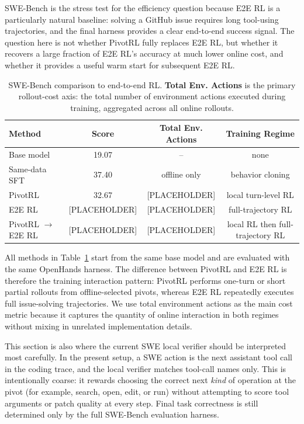 SWE-Bench is the stress test for the efficiency question because E2E RL is a particularly natural baseline: solving a GitHub issue requires long tool-using trajectories, and the final harness provides a clear end-to-end success signal. The question here is not whether PivotRL fully replaces E2E RL, but whether it recovers a large fraction of E2E RL's accuracy at much lower online cost, and whether it provides a useful warm start for subsequent E2E RL.

\begin{table}[t]
\centering
\small
\begin{tabular}{lccc}
\toprule
\textbf{Method} & \textbf{Score} & \textbf{Total Env. Actions} & \textbf{Training Regime} \\
\midrule
Base model & 19.07 & -- & none \\
Same-data SFT & 37.40 & offline only & behavior cloning \\
PivotRL & 32.67 & [PLACEHOLDER] & local turn-level RL \\
E2E RL & [PLACEHOLDER] & [PLACEHOLDER] & full-trajectory RL \\
PivotRL $\rightarrow$ E2E RL & [PLACEHOLDER] & [PLACEHOLDER] & local RL then full-trajectory RL \\
\bottomrule
\end{tabular}
\caption{
SWE-Bench comparison to end-to-end RL.
\textbf{Total Env. Actions} is the primary rollout-cost axis: the total number of environment actions executed during training, aggregated across all online rollouts.
}
\label{tab:swe_e2e}
\end{table}

All methods in Table~\ref{tab:swe_e2e} start from the same base model and are evaluated with the same OpenHands harness. The difference between PivotRL and E2E RL is therefore the training interaction pattern: PivotRL performs one-turn or short partial rollouts from offline-selected pivots, whereas E2E RL repeatedly executes full issue-solving trajectories. We use total environment actions as the main cost metric because it captures the quantity of online interaction in both regimes without mixing in unrelated implementation details.

This section is also where the current SWE local verifier should be interpreted most carefully. In the present setup, a SWE action is the next assistant tool call in the coding trace, and the local verifier matches tool-call names only. This is intentionally coarse: it rewards choosing the correct next \emph{kind} of operation at the pivot (for example, search, open, edit, or run) without attempting to score tool arguments or patch quality at every step. Final task correctness is still determined only by the full SWE-Bench evaluation harness. 

